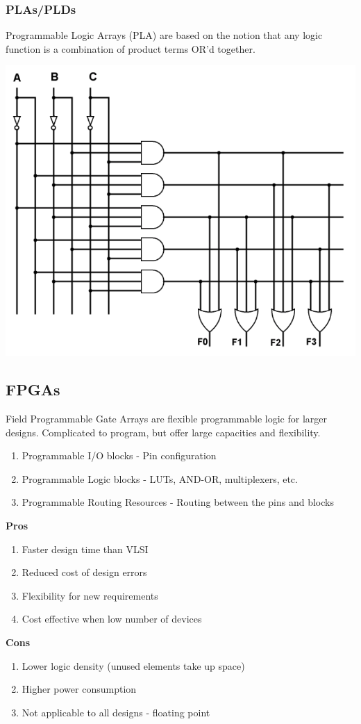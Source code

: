 \documentclass[11pt]{article}
\begin{document}
    \subsubsection{PLAs/PLDs}
    Programmable Logic Arrays (PLA) are based on the notion that any logic function is a combination of product terms OR'd together. \\
    \begin{center}
        \includegraphics[width=300 px]{pla} 
    \end{center}   
    \subsection{FPGAs}
    Field Programmable Gate Arrays are flexible programmable logic for larger designs. Complicated to program, but offer large capacities and flexibility. 
    \begin{enumerate}
        \item Programmable I/O blocks - Pin configuration
        \item Programmable Logic blocks - LUTs, AND-OR, multiplexers, etc.
        \item Programmable Routing Resources - Routing between the pins and blocks
    \end{enumerate}


    \textbf{Pros}
    \begin{enumerate}
        \item Faster design time than VLSI
        \item Reduced cost of design errors
        \item Flexibility for new requirements
        \item Cost effective when low number of devices
    \end{enumerate}
    \textbf{Cons}
    \begin{enumerate}
        \item Lower logic density (unused elements take up space)
        \item Higher power consumption
        \item Not applicable to all designs - floating point
    \end{enumerate}
    \pagebreak
\end{document}
